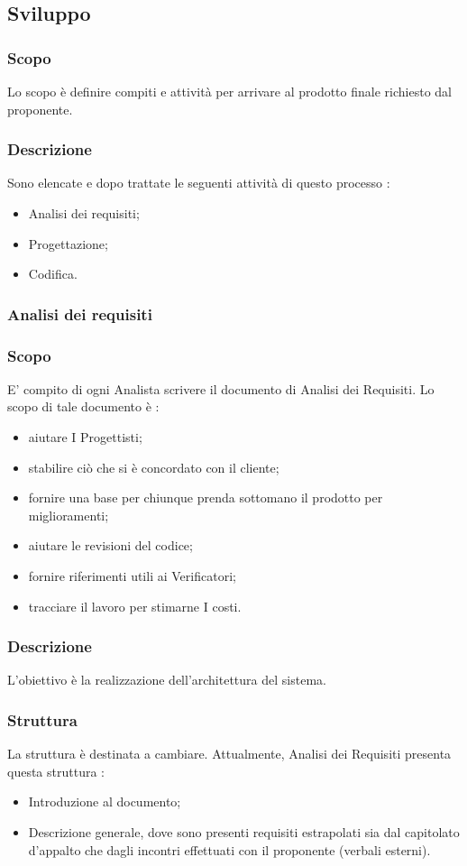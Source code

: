 \subsection{Sviluppo}
\subsubsection{Scopo}
Lo scopo è definire compiti e attività per arrivare al prodotto finale richiesto dal proponente.
\subsubsection{Descrizione}
Sono elencate e dopo trattate le seguenti attività di questo processo :
\begin{itemize}
  \item Analisi dei requisiti;
  \item Progettazione;
  \item Codifica.
\end{itemize}
\subsubsection{Analisi dei requisiti}
\subsubsection{Scopo}
E’ compito di ogni Analista scrivere il documento di Analisi dei Requisiti. Lo scopo di tale documento è :
\begin{itemize}
  \item aiutare I Progettisti;
  \item stabilire ciò che si è concordato con il cliente;
  \item fornire una base per chiunque prenda sottomano il prodotto per miglioramenti;
  \item aiutare le revisioni del codice;
  \item fornire riferimenti utili ai Verificatori;
  \item tracciare il lavoro per stimarne I costi.
\end{itemize}

\subsubsection{Descrizione}
L’obiettivo è la realizzazione dell’architettura del sistema.

\subsubsection{Struttura}
La struttura è destinata a cambiare.
Attualmente, Analisi dei Requisiti presenta questa struttura :
\begin{itemize}
  \item Introduzione al documento;
  \item Descrizione generale, dove sono presenti requisiti estrapolati sia dal capitolato d’appalto che dagli incontri effettuati con il proponente (verbali esterni).
\end{itemize}


